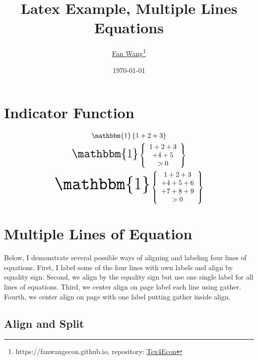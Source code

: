 \documentclass[12pt,english]{article}
\title{Latex Example, Multiple Lines Equations}
\author{\href{https://fanwangecon.github.io/}{Fan Wang}\thanks{https://fanwangecon.github.io, repository: \href{https://fanwangecon.github.io/Tex4Econ/}{Tex4Econ}}}
\date{\today}
\begin{document}
\maketitle

\section{Indicator Function}
\begin{align}\label{eq:indi}
  \begin{gathered}
    \mathbbm{1}\left\{1 + 2 +3\right\}
    \\
    \mathlarger{\mathlarger{\mathlarger{
      \mathbbm{1}
    }}}
    \left\{
      \begin{array}{cc}
          1 + 2 + 3\\
          + 4 + 5\\
          > 0\\
      \end{array}
    \right\}
    \\
    \mathlarger{\mathlarger{\mathlarger{
    \mathlarger{\mathlarger{\mathlarger{
      \mathbbm{1}
    }}}}}}
    \left\{
      \begin{array}{cc}
          1 + 2 + 3\\
          + 4 + 5 + 6 \\
          + 7 + 8 + 9 \\
          > 0\\
      \end{array}
    \right\}
  \end{gathered}
\end{align}


\section{Multiple Lines of Equation}

Below, I demonstrate several possible ways of aligning and labeling four lines of equations. First, I label some of the four lines with own labels and align by equality sign. Second, we align by the equality sign but use one single label for all lines of equations. Third, we center align on page label each line using gather. Fourth, we center align on page with one label putting gather inside align.

\pagebreak
\subsection{Align and Split}
\end{document}
